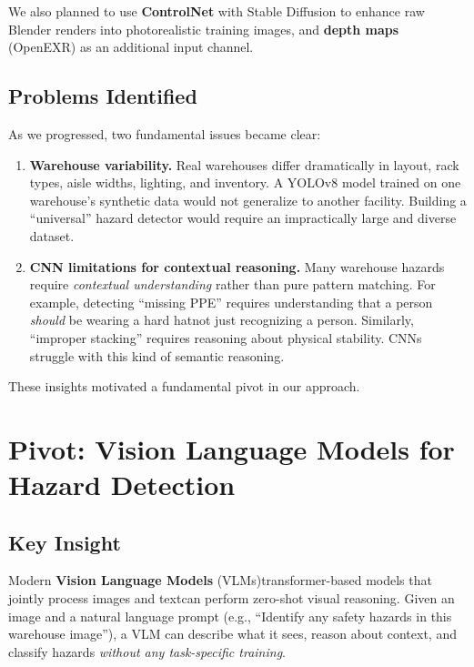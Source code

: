 \documentclass[12pt, a4paper]{article}
\begin{document}
We also planned to use \textbf{ControlNet} with Stable Diffusion to enhance raw Blender renders into photorealistic training images, and \textbf{depth maps} (OpenEXR) as an additional input channel.

\subsection{Problems Identified}

As we progressed, two fundamental issues became clear:

\begin{enumerate}
    \item \textbf{Warehouse variability.} Real warehouses differ dramatically in layout, rack types, aisle widths, lighting, and inventory. A YOLOv8 model trained on one warehouse's synthetic data would not generalize to another facility. Building a ``universal'' hazard detector would require an impractically large and diverse dataset.

    \item \textbf{CNN limitations for contextual reasoning.} Many warehouse hazards require \textit{contextual understanding} rather than pure pattern matching. For example, detecting ``missing PPE'' requires understanding that a person \textit{should} be wearing a hard hatnot just recognizing a person. Similarly, ``improper stacking'' requires reasoning about physical stability. CNNs struggle with this kind of semantic reasoning.
\end{enumerate}

These insights motivated a fundamental pivot in our approach.

\section{Pivot: Vision Language Models for Hazard Detection}

\subsection{Key Insight}

Modern \textbf{Vision Language Models} (VLMs)transformer-based models that jointly process images and textcan perform zero-shot visual reasoning. Given an image and a natural language prompt (e.g., ``Identify any safety hazards in this warehouse image''), a VLM can describe what it sees, reason about context, and classify hazards \textit{without any task-specific training}.
\end{document}
